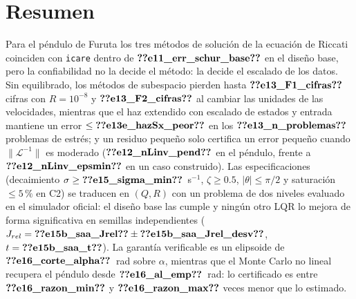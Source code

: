 \documentclass[11pt,a4paper]{article}
\begin{document}
\section*{Resumen}
Para el péndulo de Furuta los tres métodos de solución de la ecuación de Riccati coinciden con
\texttt{icare} dentro de $\V{e11_err_schur_base}$ en el diseño base, pero la confiabilidad no la decide el método:
la decide el escalado de los datos. Sin equilibrado, los métodos de subespacio pierden hasta
$\V{e13_F1_cifras}$ cifras con $R=10^{-8}$ y $\V{e13_F2_cifras}$ al cambiar las unidades de las velocidades, mientras que el haz
extendido con escalado de estados y entrada mantiene un error $\le\V{e13e_hazSx_peor}$ en los
$\V{e13_n_problemas}$ problemas de estrés; y un residuo pequeño solo certifica un error pequeño cuando
$\|\mathcal L^{-1}\|$ es moderado ($\V{e12_nLinv_pend}$ en el péndulo, frente a $\V{e12_nLinv_epsmin}$ en un caso construido).
Las especificaciones (decaimiento $\sigma\ge\V{e15_sigma_min}$~s$^{-1}$, $\zeta\ge0.5$, $|\theta|\le\pi/2$ y saturación
$\le5\,\%$ en C2) se traducen en $(Q,R)$ con un problema de dos niveles evaluado en el simulador oficial: el
diseño base las cumple y ningún otro LQR lo mejora de forma significativa en semillas independientes
($J_{rel}=\V{e15b_saa_Jrel}\pm\V{e15b_saa_Jrel_desv}$, $t=\V{e15b_saa_t}$). La garantía verificable es un elipsoide de
$\V{e16_corte_alpha}$~rad sobre $\alpha$, mientras que el Monte Carlo no lineal recupera el péndulo desde
$\V{e16_al_emp}$~rad: lo certificado es entre $\V{e16_razon_min}$ y $\V{e16_razon_max}$ veces menor que lo estimado.

\tableofcontents

\end{document}
